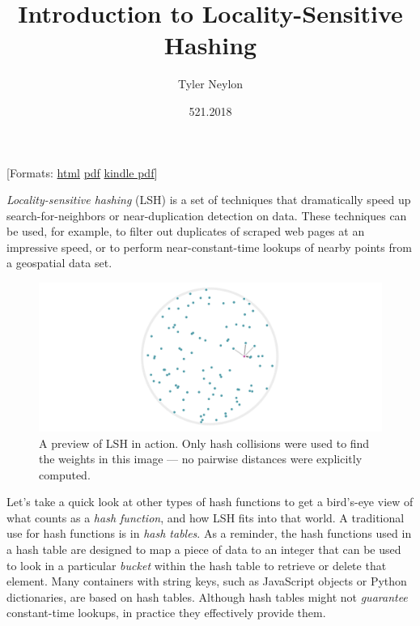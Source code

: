 \documentclass[20pt,]{extarticle}
\title{Introduction to Locality-Sensitive Hashing}
\author{Tyler Neylon}
\date{521.2018}
\newcommand{\class}[1]{}
\newcommand{\optquad}{\quad}
\newcommand{\smallscrneg}{}
\newcommand{\smallscr}[1]{}
\newcommand{\bigscr}[1]{#1}
\newcommand{\smallscrskip}[1]{}
\begin{document}
\maketitle

\newcommand{\R}{\mathbb{R}}
\newcommand{\Z}{\mathbb{Z}}
\newcommand{\eqnset}[1]{\left.\mbox{$#1$}\;\;\right\rbrace\class{postbrace}{ }}
\providecommand{\optquad}{\class{optquad}{}}
\providecommand{\smallscrneg}{\class{smallscrneg}{ }}
\providecommand{\bigscr}[1]{\class{bigscr}{#1}}
\providecommand{\smallscr}[1]{\class{smallscr}{#1}}
\providecommand{\smallscrskip}[1]{\class{smallscr}{\hskip #1}}

\providecommand{\flexquad}{\quad\smallscrskip{-0.8em}}
\providecommand{\flexspace}{\;\;\smallscrskip{-0.3em}}

{[}Formats: \href{http://tylerneylon.com/a/lsh1/lsh_post1.html}{html}
\textbar{} \href{http://tylerneylon.com/a/lsh1/lsh_post1.pdf}{pdf}
\textbar{}
\href{http://tylerneylon.com/a/lsh1/lsh_post1_for_kindle.pdf}{kindle
pdf}{]}

\emph{Locality-sensitive hashing} (LSH) is a set of techniques that
dramatically speed up search-for-neighbors or near-duplication detection
on data. These techniques can be used, for example, to filter out
duplicates of scraped web pages at an impressive speed, or to perform
near-constant-time lookups of nearby points from a geospatial data set.

\begin{figure}
\centering
\includegraphics{images/image8b@2x.gif}
\caption{A preview of LSH in action. Only hash collisions were used to
find the weights in this image --- no pairwise distances were explicitly
computed.}\label{fig:fig0}
\end{figure}

Let's take a quick look at other types of hash functions to get a
bird's-eye view of what counts as a \emph{hash function}, and how LSH
fits into that world. A traditional use for hash functions is in
\emph{hash tables}. As a reminder, the hash functions used in a hash
table are designed to map a piece of data to an integer that can be used
to look in a particular \emph{bucket} within the hash table to retrieve
or delete that element. Many containers with string keys, such as
JavaScript objects or Python dictionaries, are based on hash tables.
Although hash tables might not \emph{guarantee} constant-time lookups,
in practice they effectively provide them.
\end{document}
